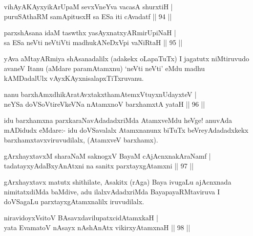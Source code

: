 \begin{shl}
vihAyA\s \s KAyxyikArUpaM sevxVneYva vacasA shurxtiH |\\
puruSAthaRM samApitusxH sa ESa iti cAvadatf \hfill || 94 ||
\end{shl}

\begin{shl}
parxshAsana idaM taswthx yasAyxnatxyARmirUpiNaH |\\
sa ESa neVti neVtiVti madhukANeDxV\s pi vaNiRtaH \hfill || 95 ||
\end{shl}

\begin{artha}
yAva aMtayARmiya shAsanadalilx (adakekx oLapaTuTx) I jagatutx niMtiruvudo avaneV Itanu (aMdare paramAtamxnu) `neVti neVti' eMdu madhu kAMDadalUlx vAyxKAyxnisalapxTiTxruvanu.
\end{artha}

\begin{shl}
nanu barxhAmxdhikAratAvxtakxthamAtemxVtuyxnUdayxteV |\\
neYSa doVSoV\s tireVkeVNa nA\s \s tamxnoV barxhamxtA yataH \hfill || 96 ||
\end{shl}


\begin{artha}%
idu barxhamxna parxkaraNavAdadadxriMda AtamxveMdu heVge! anuvAda mADidudx eMdare:- idu doVSavalalx Atamxnanunx biTuTx beVreyAdadadxkekx barxhamxtavxviruvudilalx, (AtamxveV barxhamx).
\end{artha}


\begin{shl}
gArxhayxtavxM sharaNaM saknogxV BayaM cAjAcnxnakAraNamf |\\
tadatayxyAdaBxyAnAtxni na sanitx parxtayxgAtamxni \hfill || 97 ||
\end{shl}

\begin{artha}
gArxhayxtavx matutx shithilate, Asakitx (rAga) Baya ivugaLu ajAcnxnada nimitatxdiMda baMdive, adu ilalxvAdadxriMda BayapayaRMtaviruva I doVSagaLu parxtayxgAtamxnalilx iruvudilalx.
\end{artha}


\begin{shl}
niravidoyxV\s \footnotemark[1]{}sitoV BAsavxdavilupatxcidAtamxkaH |\\
yata EvamatoV nAsayx nAshAnAtx vikirxyA\s \s tamxnaH \hfill || 98 ||
\end{shl}

